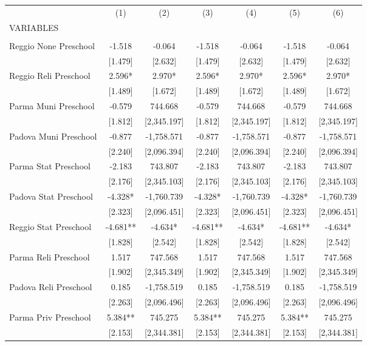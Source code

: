 \begin{tabular}{lcccccc} \hline
 & (1) & (2) & (3) & (4) & (5) & (6) \\
VARIABLES &  &  &  &  &  &  \\ \hline
 &  &  &  &  &  &  \\
Reggio None Preschool & -1.518 & -0.064 & -1.518 & -0.064 & -1.518 & -0.064 \\
 & [1.479] & [2.632] & [1.479] & [2.632] & [1.479] & [2.632] \\
Reggio Reli Preschool & 2.596* & 2.970* & 2.596* & 2.970* & 2.596* & 2.970* \\
 & [1.489] & [1.672] & [1.489] & [1.672] & [1.489] & [1.672] \\
Parma Muni Preschool & -0.579 & 744.668 & -0.579 & 744.668 & -0.579 & 744.668 \\
 & [1.812] & [2,345.197] & [1.812] & [2,345.197] & [1.812] & [2,345.197] \\
Padova Muni Preschool & -0.877 & -1,758.571 & -0.877 & -1,758.571 & -0.877 & -1,758.571 \\
 & [2.240] & [2,096.394] & [2.240] & [2,096.394] & [2.240] & [2,096.394] \\
Parma Stat Preschool & -2.183 & 743.807 & -2.183 & 743.807 & -2.183 & 743.807 \\
 & [2.176] & [2,345.103] & [2.176] & [2,345.103] & [2.176] & [2,345.103] \\
Padova Stat Preschool & -4.328* & -1,760.739 & -4.328* & -1,760.739 & -4.328* & -1,760.739 \\
 & [2.323] & [2,096.451] & [2.323] & [2,096.451] & [2.323] & [2,096.451] \\
Reggio Stat Preschool & -4.681** & -4.634* & -4.681** & -4.634* & -4.681** & -4.634* \\
 & [1.828] & [2.542] & [1.828] & [2.542] & [1.828] & [2.542] \\
Parma Reli Preschool & 1.517 & 747.568 & 1.517 & 747.568 & 1.517 & 747.568 \\
 & [1.902] & [2,345.349] & [1.902] & [2,345.349] & [1.902] & [2,345.349] \\
Padova Reli Preschool & 0.185 & -1,758.519 & 0.185 & -1,758.519 & 0.185 & -1,758.519 \\
 & [2.263] & [2,096.496] & [2.263] & [2,096.496] & [2.263] & [2,096.496] \\
Parma Priv Preschool & 5.384** & 745.275 & 5.384** & 745.275 & 5.384** & 745.275 \\
 & [2.153] & [2,344.381] & [2.153] & [2,344.381] & [2.153] & [2,344.381] \\

\end{tabular}
